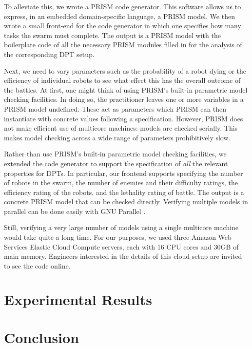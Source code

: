 \documentclass[11pt]{article}
\theoremstyle{definition}
\begin{document}
To alleviate this, we wrote a PRISM code generator.
This software allows us to express, in an embedded domain-specific language, a
PRISM model.
We then wrote a small front-end for the code generator in which one specifies
how many tasks the swarm must complete.
The output is a PRISM model with the boilerplate code of all the necessary
PRISM modules filled in for the analysis of the corresponding DPT setup.

Next, we need to vary parameters such as the probability of a robot dying or
the efficiency of individual robots to see what effect this has the overall
outcome of the battles.
%
At first, one might think of using PRISM's built-in parametric model checking
facilities.
%
In doing so, the practitioner leaves one or more variables in a PRISM model
undefined.
%
These act as parameters which PRISM can then instantiate with concrete values
following a specification.
%
However, PRISM does not make efficient use of multicore machines:
models are checked serially.
This makes model checking across a wide range of parameters prohibitively slow.

Rather than use PRISM's built-in parametric model checking facilities, we
extended the code generator to support the specification of \emph{all} the
relevant properties for DPTs.
%
In particular, our frontend supports specifying the number of robots in the
swarm, the number of enemies and their difficulty ratings, the efficiency
rating of the robots, and the lethality rating of battle.
%
The output is a concrete PRISM model that can be checked directly.
%
Verifying multiple models in parallel can be done easily with GNU Parallel
\cite{parallel}.

Still, verifying a very large number of models using a single multicore machine
would take quite a long time.
For our purposes, we used three Amazon Web Services Elastic Cloud Compute
servers, each with 16 CPU cores and 30GB of main memory.
Engineers interested in the details of this cloud setup are invited to see the
code online\footnotemark.


\section{Experimental Results}
\label{sec:results}

\section{Conclusion}
\label{sec:conclusion}
\end{document}
